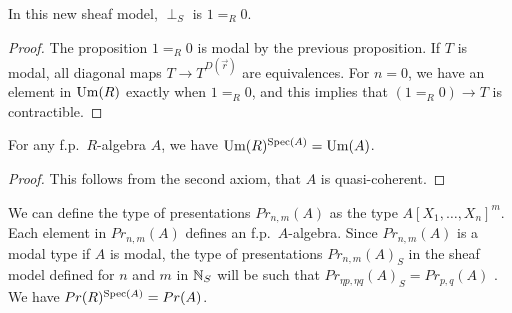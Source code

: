     \begin{proposition}
      In this new sheaf model, $\perp_S$ is $1 =_R 0$.
    \end{proposition}

    \begin{proof}
      The proposition $1=_R0$ is modal by the previous proposition.
      If $T$ is modal, all diagonal maps $T\rightarrow T^{D(\vec{r})}$ are equivalences. For $n = 0$, we have
      an element in $\mathrm{Um}(R)$ exactly when $1=_R0$, and this implies that $(1=_R0)\rightarrow T$ is contractible.
    \end{proof}
    
    \begin{lemma}\label{Um}
      For any f.p.\ $R$-algebra $A$, we have $\mathrm{Um}(R)^{\operatorname{Spec}(A)} = \mathrm{Um}(A)$.
    \end{lemma}

    \begin{proof}
      This follows from the second axiom, that $A$ is quasi-coherent.
    \end{proof}




    
    We can define the type of presentations $Pr_{n,m}(A)$ as the type $A[X_1,\dots,X_n]^m$. Each element in $Pr_{n,m}(A)$ defines an
    f.p.\ $A$-algebra. Since $Pr_{n,m}(A)$ is a modal type if $A$ is modal, the type of presentations $Pr_{n,m}(A)_S$ in the sheaf model
    defined for $n$ and $m$ in $\mathbb{N}_S$ will be such that $Pr_{\eta p,\eta q}(A)_S = Pr_{p,q}(A)$ \cite{CRS21}.
    We have $Pr(R)^{\operatorname{Spec}(A)} = Pr(A)$.
    
